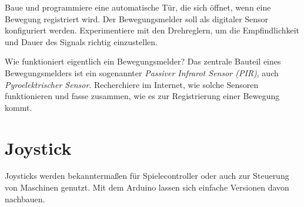 \begin{projekt}\label{proj:tueroeffner}
	Baue und programmiere eine automatische Tür, die sich öffnet, wenn eine Bewegung registriert wird. Der Bewegungsmelder soll als digitaler Sensor konfiguriert werden. Experimentiere mit den Drehreglern, um die Empfindlichkeit und Dauer des Signals richtig einzustellen.
\end{projekt}

\begin{recherche}{Wie funktioniert eigentlich ein Bewegungsmelder?}
	Das zentrale Bauteil eines Bewegungsmelders ist ein sogenannter \emph{Passiver Infrarot Sensor (PIR)}, auch \emph{Pyroelektrischer Sensor}. Recherchiere im Internet, wie solche Sensoren funktionieren und fasse zusammen, wie es zur Registrierung einer Bewegung kommt.	
\end{recherche}


\newpage
\section{Joystick}
\label{sec:joystick}

Joysticks werden bekanntermaßen für Spielecontroller oder auch zur Steuerung von Maschinen genutzt. Mit dem Arduino lassen sich einfache Versionen davon nachbauen.

